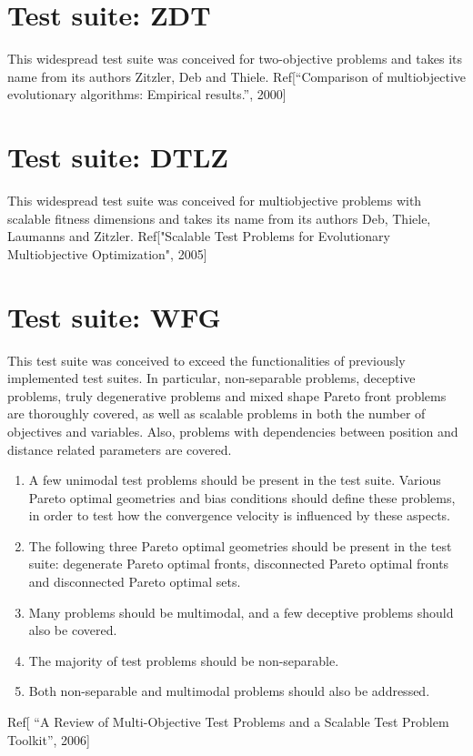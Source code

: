 \documentclass[ms,english]{stthesis}
\begin{document}
            \section{Test suite: ZDT}
            This widespread test suite was conceived for two-objective problems and takes its name from its authors Zitzler, Deb and Thiele.
            Ref[“Comparison of multiobjective evolutionary algorithms: Empirical results.”, 2000]

            \section{Test suite: DTLZ}
            This widespread test suite was conceived for multiobjective problems with scalable fitness dimensions and takes its name from its authors Deb, Thiele, Laumanns and Zitzler.
            Ref["Scalable Test Problems for Evolutionary Multiobjective Optimization", 2005]

            \section{Test suite: WFG}
            This test suite was conceived to exceed the functionalities of previously implemented test suites.
            In particular, non-separable problems, deceptive problems, truly degenerative problems and mixed shape Pareto front problems are thoroughly covered, 
            as well as scalable problems in both the number of objectives and variables. Also, problems with dependencies between position and distance related parameters are covered.
                \begin{enumerate}

                    \item A few unimodal test problems should be present in the test suite. 
                    Various Pareto optimal geometries and bias conditions should define these problems, 
                    in order to test how the convergence velocity is influenced by these aspects.

                    \item The following three Pareto optimal geometries should be present in the test suite: 
                    degenerate Pareto optimal fronts, disconnected Pareto optimal fronts and disconnected Pareto optimal sets.

                    \item Many problems should be multimodal, and a few deceptive problems should also be covered.
                    \item The majority of test problems should be non-separable.
                    \item Both non-separable and multimodal problems should also be addressed.
                \end{enumerate}
            Ref[ “A Review of Multi-Objective Test Problems and a Scalable Test Problem Toolkit”, 2006]
\end{document}
